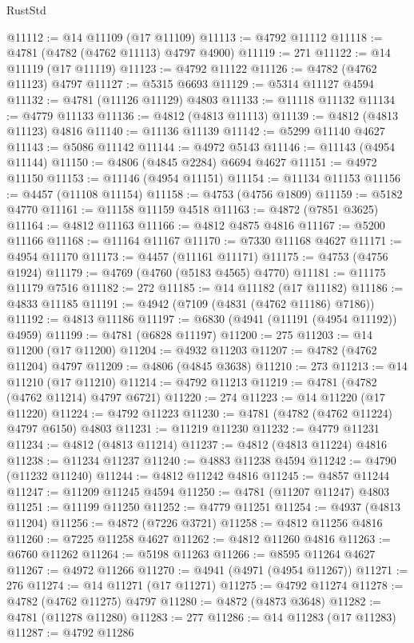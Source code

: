\begin{lexlean}{RustStd}
\begin{coremodule}
@11112 := @14 @11109 (@17 @11109)
@11113 := @4792 @11112
@11118 := @4781 (@4782 (@4762 @11113) @4797 @4900)
@11119 := 271
@11122 := @14 @11119 (@17 @11119)
@11123 := @4792 @11122
@11126 := @4782 (@4762 @11123) @4797
@11127 := @5315 @6693
@11129 := @5314 @11127 @4594
@11132 := @4781 (@11126 @11129) @4803
@11133 := @11118 @11132
@11134 := @4779 @11133
@11136 := @4812 (@4813 @11113)
@11139 := @4812 (@4813 @11123) @4816
@11140 := @11136 @11139
@11142 := @5299 @11140 @4627
@11143 := @5086 @11142
@11144 := @4972 @5143
@11146 := @11143 (@4954 @11144)
@11150 := @4806 (@4845 @2284) @6694 @4627
@11151 := @4972 @11150
@11153 := @11146 (@4954 @11151)
@11154 := @11134 @11153
@11156 := @4457 (@11108 @11154)
@11158 := @4753 (@4756 @1809)
@11159 := @5182 @4770
@11161 := @11158 @11159 @4518
@11163 := @4872 (@7851 @3625)
@11164 := @4812 @11163
@11166 := @4812 @4875 @4816
@11167 := @5200 @11166
@11168 := @11164 @11167
@11170 := @7330 @11168 @4627
@11171 := @4954 @11170
@11173 := @4457 (@11161 @11171)
@11175 := @4753 (@4756 @1924)
@11179 := @4769 (@4760 (@5183 @4565) @4770)
@11181 := @11175 @11179 @7516
@11182 := 272
@11185 := @14 @11182 (@17 @11182)
@11186 := @4833 @11185
@11191 := @4942 (@7109 (@4831 (@4762 @11186) @7186))
@11192 := @4813 @11186
@11197 := @6830 (@4941 (@11191 (@4954 @11192)) @4959)
@11199 := @4781 (@6828 @11197)
@11200 := 275
@11203 := @14 @11200 (@17 @11200)
@11204 := @4932 @11203
@11207 := @4782 (@4762 @11204) @4797
@11209 := @4806 (@4845 @3638)
@11210 := 273
@11213 := @14 @11210 (@17 @11210)
@11214 := @4792 @11213
@11219 := @4781 (@4782 (@4762 @11214) @4797 @6721)
@11220 := 274
@11223 := @14 @11220 (@17 @11220)
@11224 := @4792 @11223
@11230 := @4781 (@4782 (@4762 @11224) @4797 @6150) @4803
@11231 := @11219 @11230
@11232 := @4779 @11231
@11234 := @4812 (@4813 @11214)
@11237 := @4812 (@4813 @11224) @4816
@11238 := @11234 @11237
@11240 := @4883 @11238 @4594
@11242 := @4790 (@11232 @11240)
@11244 := @4812 @11242 @4816
@11245 := @4857 @11244
@11247 := @11209 @11245 @4594
@11250 := @4781 (@11207 @11247) @4803
@11251 := @11199 @11250
@11252 := @4779 @11251
@11254 := @4937 (@4813 @11204)
@11256 := @4872 (@7226 @3721)
@11258 := @4812 @11256 @4816
@11260 := @7225 @11258 @4627
@11262 := @4812 @11260 @4816
@11263 := @6760 @11262
@11264 := @5198 @11263
@11266 := @8595 @11264 @4627
@11267 := @4972 @11266
@11270 := @4941 (@4971 (@4954 @11267))
@11271 := 276
@11274 := @14 @11271 (@17 @11271)
@11275 := @4792 @11274
@11278 := @4782 (@4762 @11275) @4797
@11280 := @4872 (@4873 @3648)
@11282 := @4781 (@11278 @11280)
@11283 := 277
@11286 := @14 @11283 (@17 @11283)
@11287 := @4792 @11286

\end{coremodule}
\end{lexlean}
